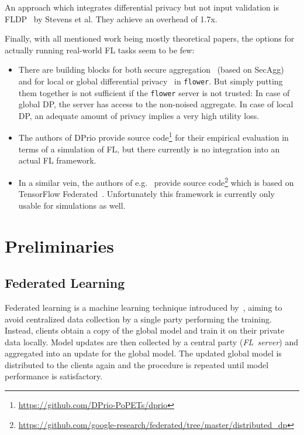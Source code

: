 \documentclass{article}
\begin{document}
An approach which integrates differential privacy but not input validation
is FLDP~\cite{Stevens2021EfficientDP} by Stevens et al. They achieve an overhead
of 1.7x.

Finally, with all mentioned work being mostly theoretical papers, the
options for actually running real-world FL tasks seem to be few:
\begin{itemize}
  \setlength\itemsep{0em}
\item There are building blocks for both secure aggregation~\cite{flower-docs-sa}
  (based on SecAgg) and for local or global differential privacy~\cite{flower-docs-dp} in \texttt{flower}. But
  simply putting them together is not sufficient if the \texttt{flower} server is not trusted: In case of global DP, the
  server has access to the non-noised aggregate. In case of local DP, 
  an adequate amount of privacy implies a very high utility loss.
\item The authors of DPrio provide source code\footnote{\url{https://github.com/DPrio-PoPETs/dprio}} for their empirical evaluation in
  terms of a simulation of FL, but there currently is no integration into an actual FL framework.
\item In a similar vein, the authors of e.g.~\cite{Kairouz2021TheDD} provide
  source code\footnote{\url{https://github.com/google-research/federated/tree/master/distributed_dp}} which is based on TensorFlow Federated~\cite{tff}. Unfortunately this
  framework is currently only usable for simulations as well.
\end{itemize}

\section{Preliminaries}

\subsection{Federated Learning}
Federated learning is a machine learning technique introduced
by~\citet{FL}, aiming to avoid centralized data collection by a single
party performing the training. Instead, clients obtain a copy of
the global model and train it on their private data locally. Model updates are
then collected by a central party (\emph{FL~server}) and aggregated into an update for
the global model. The updated global model is distributed to the clients again and the
procedure is repeated until model performance is satisfactory.
\end{document}
